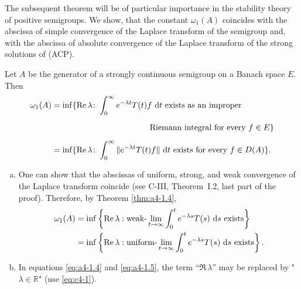 

The subsequent theorem will be of particular importance in the stability theory of positive semigroups.
We show, that the constant $\omega_{1}(A)$ coincides with the abscissa of simple convergence of the Laplace transform of the semigroup and, with the abscissa of absolute convergence of the Laplace transform of the strong solutions of (ACP).

\begin{theorem}\label{thm:a4-1.4}
Let $A$ be the generator of a strongly continuous semigroup on a Banach space $E$. 
Then
\begin{align}\label{eq:a4-1.4}
\omega_{1}(A) &= \inf\{\Re\,\lambda \colon \int_{0}^{\infty} e^{-\lambda t} T(t)f \,\dt \text{ exists as an improper} \\
&\phantom{= \inf\{\Re\,\lambda \colon \int_{0}^{\infty} e^{-\lambda t} T(t)f} \text{Riemann integral for every } f \in E\} \notag \\
&= \inf\{\Re\,\lambda \colon \int_{0}^{\infty} \|e^{-\lambda t} T(t)f\| \,\dt \text{ exists for every } f \in D(A)\}.\notag
\end{align}
\end{theorem}
\begin{remarks*}\label{rem:a4-1.4}

\begin{enumerate}[(a), wide, labelsep=1em, itemindent=\parindent]

\item 
One can show that the abscissas of uniform, strong, and weak convergence of the Laplace transform coincide (see C-III, Theorem~I.2, last part of the proof). 
Therefore, by Theorem \ref{thm:a4-1.4},
\begin{align}\label{eq:a4-1.5}
\omega_1(A) &= \inf \left\{ \mathop{}\!\mathrm{Re}\,\lambda : \text{weak-} \lim_{t \to \infty} \int_0^t e^{-\lambda s} T(s) \,\mathop{}\!\mathrm{d}{s} \text{ exists} \right\}
\\
    &= \inf \left\{ \mathop{}\!\mathrm{Re}\,\lambda : \text{uniform-} \lim_{t \to \infty} \int_0^t e^{-\lambda s} T(s) \,\mathop{}\!\mathrm{d}{s} \text{ exists} \right\}.\notag
\end{align}

\item
In equations \eqref{eq:a4-1.4} and \eqref{eq:a4-1.5}, the term \enquote{$\Re\,\lambda$} may be replaced by "$\lambda \in \mathbb{R}$" (use \eqref{eq:c4-1}).
\end{enumerate}

\end{remarks*}

